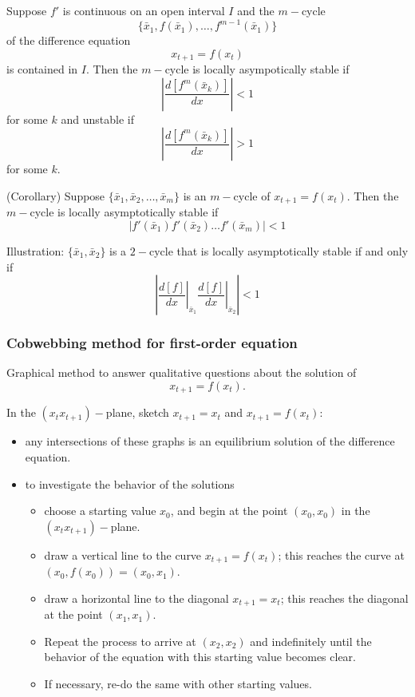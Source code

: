 \begin{theorem}
Suppose $f'$ is continuous on an open interval $I$ and the $m-$cycle
$$\{\bar x_1, f(\bar x_1), \dots , f^{m-1}(\bar x_1)\}$$
of the difference equation $$x_{t+1}=f(x_t)$$ is contained in $I$. Then the $m-$cycle is locally asympotically stable if
$$\left| \frac{d[f^m(\bar x_k)]}{dx}\right|<1$$
for some $k$ and unstable if
$$\left| \frac{d[f^m(\bar x_k)]}{dx}\right|>1$$
for some $k$.
\end{theorem}



\begin{theorem}(Corollary)
Suppose $\{\bar x_1, \bar x_2, \dots , \bar x_m\}$ is an $m-$cycle of $x_{t+1}=f(x_t)$. Then the $m-$cycle is locally asymptotically stable if $$\left |   f'(\bar x_1)f'(\bar x_2)\dots f'(\bar x_m)\right |<1$$
\end{theorem}


Illustration: $\{\bar x_1,\bar x_2\}$ is a $2-$cycle that is locally asymptotically stable if and only if $$\left| \left . \frac{d[f]}{dx}\right |_{\bar x_1}\left . \frac{d[f]}{dx}\right |_{\bar x_2}\right|<1$$


\subsubsection{Cobwebbing method for first-order equation}
Graphical method to answer qualitative questions about the solution of $$x_{t+1}=f(x_t).$$

In the $(x_tx_{t+1})-$plane, sketch $x_{t+1}=x_{t}$ and $x_{t+1}=f(x_t)$:
\begin{itemize}
\item any intersections of these graphs is an equilibrium solution of the difference equation.
\item to investigate the behavior of the solutions
\begin{itemize}
\item choose a starting value $x_0$, and begin at the point $(x_0,x_0)$ in the $(x_tx_{t+1})-$plane.
\item draw a vertical line to the curve $x_{t+1}=f(x_t)$; this reaches the curve at $(x_0,f(x_0))=(x_0,x_1)$.
\item draw a horizontal line to the diagonal $x_{t+1}=x_t$; this reaches the diagonal at the point $(x_1,x_1)$.
\item Repeat the process to arrive at $(x_2,x_2)$ and indefinitely until the behavior of the equation with this starting value becomes clear.
\item If necessary, re-do the same with other starting values.
\end{itemize}
\end{itemize}




